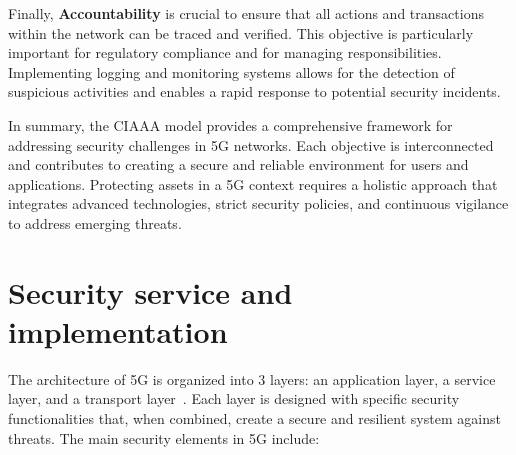 \documentclass[english]{article}
\begin{document}
Finally, \textbf{Accountability} is crucial to ensure that all actions and
transactions within the network can be traced and verified. This objective is
particularly important for regulatory compliance and for managing
responsibilities. Implementing logging and monitoring systems allows for the
detection of suspicious activities and enables a rapid response to potential
security incidents.

In summary, the CIAAA model provides a comprehensive framework for addressing
security challenges in 5G networks. Each objective is interconnected and
contributes to creating a secure and reliable environment for users and
applications. Protecting assets in a 5G context requires a holistic approach
that integrates advanced technologies, strict security policies, and continuous
vigilance to address emerging threats.

\section{Security service and implementation}\label{sec:4}
The architecture of 5G is organized into 3 layers: an application layer, a
service layer, and a transport layer~\cite{Jover2018Security}. Each layer is
designed with specific security functionalities that, when combined, create a
secure and resilient system against threats. The main security elements in 5G
include:
\end{document}
